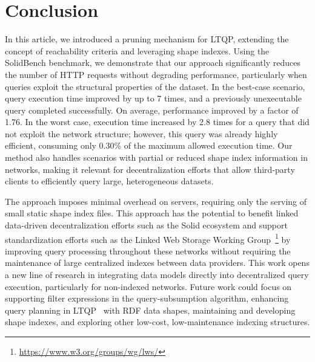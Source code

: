 \section{Conclusion}\label{sec:conclusion}

In this article, we introduced a pruning mechanism for \ac{LTQP}, extending the concept of reachability criteria and leveraging shape indexes.
Using the SolidBench benchmark, we demonstrate that our approach significantly reduces the number of \ac{HTTP} requests without degrading performance, particularly when queries exploit the structural properties of the dataset.
In the best-case scenario, query execution time improved by up to 7 times, and a previously unexecutable query completed successfully.
On average, performance improved by a factor of 1.76.
In the worst case, execution time increased by 2.8 times for a query that did not exploit the network structure; however, this query was already highly efficient, consuming only 0.30\% of the maximum allowed execution time.
Our method also handles scenarios with partial or reduced shape index information in networks, making it relevant for decentralization efforts that allow third-party clients to efficiently query large, heterogeneous datasets.

The approach imposes minimal overhead on servers, requiring only the serving of small static shape index files.
This approach has the potential to benefit linked data-driven decentralization efforts such as the Solid ecosystem and support standardization efforts such as the Linked Web Storage Working Group~\footnote{\url{https://www.w3.org/groups/wg/lws/}} by improving query processing throughout these networks without requiring the maintenance of large centralized indexes between data providers.
This work opens a new line of research in integrating data models directly into decentralized query execution, particularly for non-indexed networks. 
Future work could focus on supporting filter expressions in the query-subsumption algorithm, enhancing query planning in \ac{LTQP}~\cite{taelman2024towards} with \ac{RDF} data shapes,
maintaining and developing shape indexes, and exploring other low-cost, low-maintenance indexing structures.
